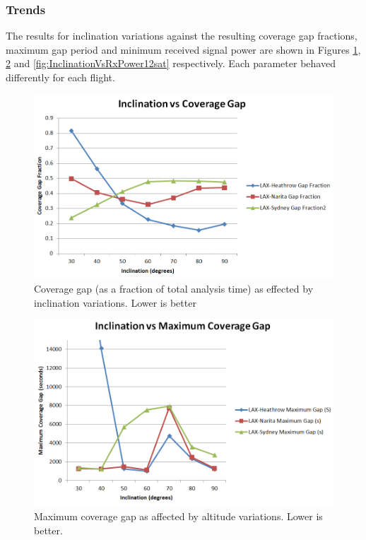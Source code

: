 \subsubsection{Trends}
The results for inclination variations against the resulting coverage gap fractions, maximum gap period and minimum received signal power are shown in Figures \ref{fig:InclinationVsCovGap12sat}, \ref{fig:InclinationVsMaxGap12sat} and \ref{fig:InclinationVsRxPower12sat} respectively. Each parameter behaved differently for each flight.
\begin{figure}[htbp]
	\centering
	\includegraphics[scale = 0.6]{Pictures/InclinationVsCovGap12sat.png}
	
	\caption{Coverage gap (as a fraction of total analysis time) as effected by inclination  variations. Lower is better}
	\label{fig:InclinationVsCovGap12sat}
\end{figure} 


\begin{figure}[htbp]
	\centering
	\includegraphics[scale = 0.6]{Pictures/InclinationVsMaxGap12sat.png}
	
	\caption{Maximum coverage gap as affected by altitude variations. Lower is better.}
	\label{fig:InclinationVsMaxGap12sat}
\end{figure} 

